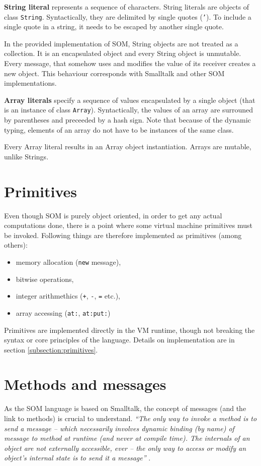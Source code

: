\documentclass[thesis=M,english]{FITthesis}[2019/12/23]
\begin{document}
\textbf{String literal} represents a sequence of characters. String literals are objects of class \texttt{String}.
Syntactically, they are delimited by single quotes (\texttt{'}). To include a single quote in a string, it needs
to be escaped by another single quote.

In the provided implementation of SOM, String objects are not treated as a collection. It is an encapsulated object
and every String object is unmutable. Every message, that somehow uses and modifies the value of its receiver
creates a new object. This behaviour corresponds with Smalltalk and other SOM implementations.

\textbf{Array literals} specify a sequence of values encapsulated by a single object (that is an instance of class
\texttt{Array}). Syntactically, the values of an array are surrouned by parentheses and preceeded by a hash sign.
Note that because of the dynamic typing, elements of an array do not have to be instances of the same class.

Every Array literal results in an Array object instantiation. Arrays are mutable, unlike Strings.

\section{Primitives}
Even though SOM is purely object oriented, in order to get any actual computations done, there is a point where
some virtual machine primitives must be invoked. Following things are therefore implemented as primitives (among others):
\begin{itemize}
	\item memory allocation (\texttt{new} message),
	\item bitwise operations,
	\item integer arithmethics (\texttt{+}, \texttt{-}, \texttt{=} etc.),
	\item array accessing (\texttt{at:}, \texttt{at:put:})
\end{itemize}

Primitives are implemented directly in the VM runtime, though not breaking the syntax or core principles of the
language. Details on implementation are in section \ref{subsection:primitives}.

\section{Methods and messages}
\label{section:messages}
As the SOM language is based on Smalltalk, the concept of messages (and the link to methods) is crucial to understand.
\textit{``The only way to invoke a method is to send a message -- which necessarily involves dynamic binding
(by name) of message to method at runtime (and never at compile time). The internals of an object are not
externally accessible, ever -- the only way to access or modify an object's internal state is to send it
a message''} \cite{smalltalk-essentials}.
\end{document}
